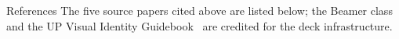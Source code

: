 \documentclass[aspectratio=169]{beamer}
\begin{document}

\begin{frame}[allowframebreaks]{References}
  The five source papers cited above are listed below; the Beamer class~\cite{tantau2004} and the UP Visual Identity Guidebook~\cite{upvig2017} are credited for the deck infrastructure.

  \vskip 6pt
  \printbibliography
\end{frame}
\end{document}
